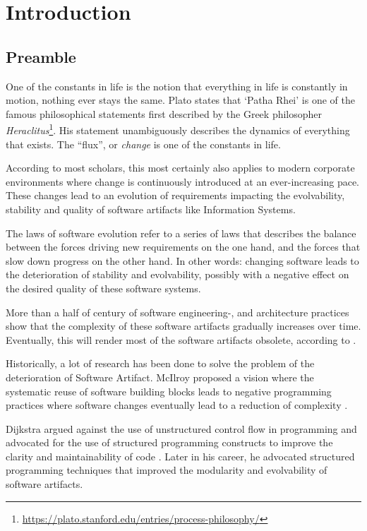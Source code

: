 \chapter{Introduction} \label{introduction}

\section{Preamble} \label{sec:preamble}

One of the constants in life is the notion that everything in life is constantly in
motion, nothing ever stays the same. Plato states that \enquote*{Patha Rhei} is one of the
famous philosophical statements first described by the Greek philosopher
\emph{Heraclitus}\footnote{\url{https://plato.stanford.edu/entries/process-philosophy/}}.
His statement unambiguously describes the dynamics of everything that exists. The
\enquote{flux}, or \emph{change} is one of the constants in life. 

According to most scholars, this most certainly also applies to modern corporate
environments where change is continuously introduced at an ever-increasing pace. These
changes lead to an evolution of requirements impacting the evolvability, stability and
quality of software artifacts like Information Systems.

The laws of software evolution refer to a series of laws that describes the balance
between the forces driving new requirements on the one hand, and the forces that slow down
progress on the other hand. In other words: changing software leads to the deterioration of
stability and evolvability, possibly with a negative effect on the desired quality of
these software systems. \citeauthor*{lehman_programs_1980}

More than a half of century of software engineering-, and architecture practices show that
the complexity of these software artifacts gradually increases over time. Eventually, this
will render most of the software artifacts obsolete, according to
\citeauthor{lehman_programs_1980}.

Historically, a lot of research has been done to solve the problem of the deterioration of
Software Artifact. McIlroy proposed a vision where the systematic reuse of software
building blocks leads to negative programming practices where software changes eventually
lead to a reduction of complexity \parencite{p_naur_nato_1968}. 

Dijkstra argued against the use of unstructured control flow in programming and advocated
for the use of structured programming constructs to improve the clarity and
maintainability of code \parencite{dijkstra_letters_1968}. Later in his career, he
advocated structured programming techniques that improved the modularity and evolvability
of software artifacts.

